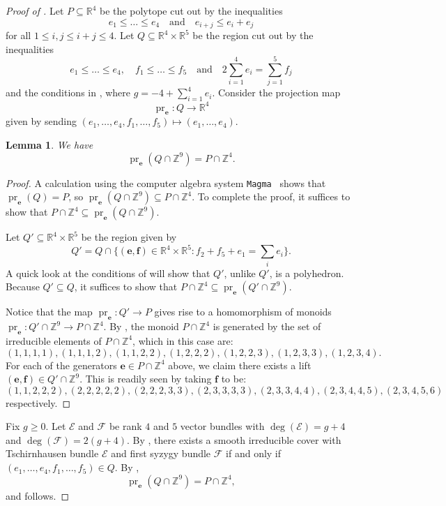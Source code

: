 \documentclass[11pt]{amsart}
\numberwithin{theorem}{section}
\numberwithin{equation}{section}
\newtheorem{lemma}[theorem]{Lemma}
\theoremstyle{definition}\newtheorem{defn}[theorem]{Definition}
\theoremstyle{definition}\newtheorem{remark}[theorem]{Remark}
\theoremstyle{definition}\newtheorem{question}[theorem]{Question}
\theoremstyle{definition}\newtheorem{problem}[theorem]{Problem}
\newcommand{\RR}{\mathbb{R}}
\newcommand{\ZZ}{\mathbb{Z}}
\newcommand{\cE}{\mathcal{E}}
\newcommand{\cF}{\mathcal{F}}
\DeclareMathOperator{\pr}{pr}
\renewcommand{\subset}{\subseteq}
\begin{document}
\begin{proof}[Proof of ]


Let $P \subseteq \RR^4$ be the polytope cut out by the inequalities 
\[
e_1 \leq \dots \leq e_4 \quad \text{and} \quad e_{i + j} \leq e_i + e_j
\]
 for all $1 \leq i,j \leq i + j \leq 4$. Let $Q \subseteq \RR^4 \times \RR^5$ be the region cut out by the inequalities  
 \[
e_1 \leq \dots \leq e_4, \quad f_1 \leq \dots \leq f_5 \quad \text{and} \quad 2\sum_{i=1}^4 e_i = \sum_{j=1}^5 f_j
\]
and the conditions in , where $g = -4 + \sum_{i=1}^4 e_i$. Consider the projection map
\[
    \pr_{\boldsymbol{e}} \colon Q \rightarrow \RR^4 
\]
given by sending $(e_1,\dots,e_4,f_1,\dots,f_5) \mapsto (e_1,\dots,e_4)$. 

\begin{lemma}
\label{lem:projection}
We have
\[
\pr_{\boldsymbol{e}}(Q \cap \ZZ^9) = P \cap \ZZ^4 .
\]
\end{lemma}
\begin{proof}
A calculation using the computer algebra system \texttt{Magma}~\cite{magma} shows that $\pr_{\boldsymbol{e}}(Q) = P$, so $\pr_{\boldsymbol{e}}(Q \cap \ZZ^9) \subset P \cap \ZZ^4$. To complete the proof, it suffices to show that $P \cap \ZZ^4 \subseteq \pr_{\boldsymbol{e}}(Q \cap \ZZ^9)$.

Let $Q' \subseteq \RR^4 \times \RR^5$ be the region given by 
\[
    Q' = Q \cap \Big \{(\mathbf{e},\mathbf{f}) \in \RR^4 \times \RR^5 : f_2 + f_5 + e_1 = \sum_i e_i \Big\}.
\]
A quick look at the conditions of  will show that $Q'$, unlike $Q'$, is a polyhedron. Because $Q' \subseteq Q$, it suffices to show that $P \cap \ZZ^4 \subseteq \pr_{\boldsymbol{e}}(Q' \cap \ZZ^9)$.

Notice that the map $\pr_{\boldsymbol{e}} \colon Q' \rightarrow P$ gives rise to a homomorphism of monoids $\pr_{\boldsymbol{e}} \colon Q' \cap \ZZ^9 \rightarrow P \cap \ZZ^4$. By , the monoid $P \cap \ZZ^4$ is generated by the set of irreducible elements of $P \cap \ZZ^4$, which in this case are:
\[
    (1,1,1,1), (1,1,1,2), (1,1,2,2), (1,2,2,2), (1,2,2,3), (1,2,3,3), (1,2,3,4).
\]
For each of the generators $\mathbf{e} \in P \cap \ZZ^4$ above, we claim there exists a lift $(\mathbf{e},\mathbf{f}) \in Q' \cap \ZZ^9$. This is readily seen by taking $\mathbf{f}$ to be:
\[
    (1,1,2,2,2), (2,2,2,2,2), (2,2,2,3,3), (2,3,3,3,3), (2,3,3,4,4), (2,3,4,4,5), (2,3,4,5,6)
\]
respectively. 
\end{proof}

Fix $g \geq 0$. Let $\cE$ and $\cF$ be rank $4$ and $5$ vector bundles with $\deg(\cE) = g+4$ and $\deg(\cF) = 2(g+4)$. By , there exists a smooth irreducible cover with Tschirnhausen bundle $\cE$ and first syzygy bundle $\cF$ if and only if $(e_1,\dots,e_4,f_1,\dots,f_5) \in Q$. By , 
\[
 \pr_{\boldsymbol{e}}(Q \cap \ZZ^9) = P \cap \ZZ^4,
\]
and  follows.
\end{proof}
\end{document}
